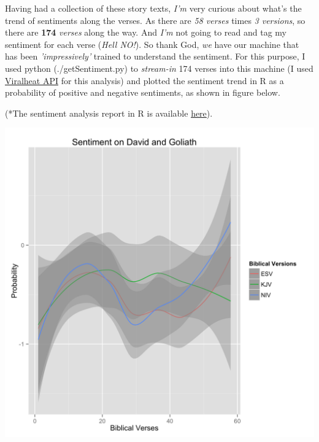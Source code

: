 \documentclass{article}
\begin{document}
\begin{multicols}{2}
Having had a collection of these story texts, \textit{I'm} very curious about what's the trend of sentiments along the verses. 
As there are \textit{58 verses} times \textit{3 versions}, so there are \textbf{174} \textit{verses} along the way. 
And \textit{I'm} not going to read and tag my sentiment for each verse (\textit{Hell NO!}). 
So thank God, \textit{we} have our machine that has been \textit{'impressively'} trained to understand the sentiment. 
For this purpose, I used python (./getSentiment.py) to \textit{stream-in} 174 verses into this machine (I used \href{http://web.viralheat.com/sentiment-api/}{Viralheat API} for this analysis) and plotted the sentiment trend in R as a probability of positive and negative sentiments, as shown in figure below.

(*The sentiment analysis report in R is available \href{https://www.dropbox.com/s/q70ip7zgxobbmvt/sentimentPlot.pdf}{here}).

\bigskip
\noindent
\begin{minipage}{\linewidth}
    \centering
    \includegraphics[width=1.\textwidth]{img/sentimentPlot.png}

\end{minipage}

\end{multicols}  
\newpage
\end{document}
